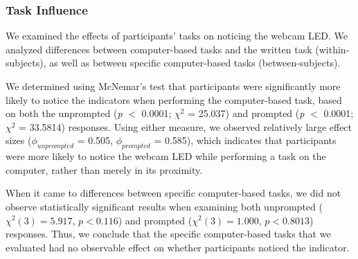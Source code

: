\documentclass{sigchi}
\begin{document}

\subsubsection{Task Influence}

We examined the effects of participants' tasks on noticing the webcam LED. We analyzed differences between computer-based tasks and the written task (within-subjects), as well as between specific computer-based tasks (between-subjects).

We determined using McNemar's test that participants were significantly more likely to notice the indicators when performing the computer-based task, based on both the unprompted (\textit{p} $<$ 0.0001; $\chi^2$ = 25.037) and prompted (\textit{p} $<$ 0.0001; $\chi^2$ = 33.5814) responses.  Using either measure, we observed relatively large effect sizes (\textit{$\phi_{unprompted}$} = 0.505, \textit{$\phi_{prompted}$} = 0.585), which indicates that participants were more likely to notice the webcam LED while performing a task on the computer, rather than merely in its proximity.

When it came to differences between specific computer-based tasks, we did not observe statistically significant results when examining both unprompted ($\chi^2(3)=5.917$, $p<0.116$) and prompted ($\chi^2(3)=1.000$, $p<0.8013$) responses. Thus, we conclude that the specific computer-based tasks that we evaluated had no observable effect on whether participants noticed the indicator.


\end{document}
